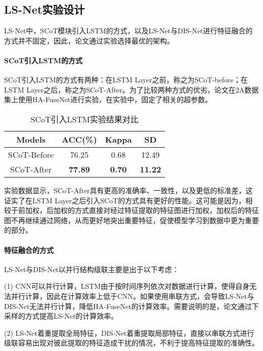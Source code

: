 \subsection{LS-Net实验设计}

LS-Net中，SCoT模块引入LSTM的方式，以及LS-Net与DIS-Net进行特征融合的方式并不固定，因此，论文通过实验选择最优的架构。

\paragraph{SCoT引入LSTM的方式}

SCoT引入LSTM的方式有两种：在LSTM Layer之前，称之为SCoT-before；在LSTM Layer之后，称之为SCoT-After。为了比较两种方式的优劣，论文在2A数据集上使用HA-FuseNet进行实验，在实验中，固定了相关的超参数。
\begin{table}[ht]
    \centering
    \caption{SCoT引入LSTM实验结果对比}
    \label{tab:ls}
    \begin{tabularx}{\textwidth}{CCCC}
      \toprule
      Models & ACC(\%) & Kappa & SD \\
      \midrule
      SCoT-Before & 76.25 & 0.68 & 12.49 \\
      SCoT-After & \textbf{77.89} & \textbf{0.70} & \textbf{11.22} \\
      \bottomrule
    \end{tabularx}
\end{table}

实验数据显示，SCoT-After具有更高的准确率、一致性，以及更低的标准差，这证实了在LSTM Layer之后引入SCoT的方式具有更好的性能。这可能是因为，相较于前加权，后加权的方式直接对经过特征提取的特征图进行加权，加权后的特征图不再继续通过网络，从而更好地突出重要特征，促使模型学习到数据中更为重要的部分。

\paragraph{特征融合的方式}

LS-Net与DIS-Net以并行结构级联主要是出于以下考虑：

(1) CNN可以并行计算，LSTM由于按时间序列依次对数据进行计算，使得自身无法并行计算，因此在计算效率上低于CNN。如果使用串联方式，会导致LS-Net与DIS-Net无法并行计算，降低HA-FuseNet的计算效率。需要说明的是，论文通过下采样的方式提高LS-Net的计算效率。

(2) LS-Net着重提取全局特征，DIS-Net着重提取局部特征，直接以串联方式进行级联容易出现对彼此提取的特征造成干扰的情况，不利于提高特征提取的准确性。

